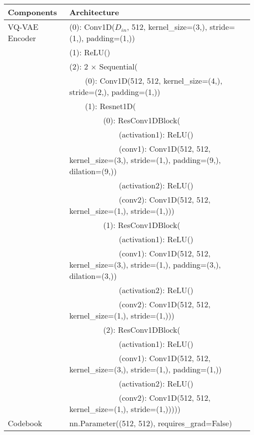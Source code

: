 \documentclass[10pt,twocolumn,letterpaper]{article}
\begin{document}
\begin{table*}[h]
    \centering\setlength{\tabcolsep}{12pt}
    \begin{tabular}{ll}
    \toprule
        Components & Architecture \\ \midrule
        VQ-VAE Encoder & (0): Conv1D($D_{in}$, 512, kernel\_size=(3,), stride=(1,), padding=(1,)) \\
        ~ & (1): ReLU() \\
        ~ & (2): 2 $\times$ Sequential( \\
        ~ &   ~~~~(0): Conv1D(512, 512, kernel\_size=(4,), stride=(2,), padding=(1,)) \\
        ~ &   ~~~~(1): Resnet1D( \\
        ~ &   ~~~~~~~~    (0): ResConv1DBlock( \\
        ~ &   ~~~~~~~~~~~~      (activation1): ReLU() \\
        ~ &   ~~~~~~~~~~~~      (conv1): Conv1D(512, 512, kernel\_size=(3,), stride=(1,), padding=(9,), dilation=(9,)) \\
        ~ &   ~~~~~~~~~~~~      (activation2): ReLU() \\
        ~ &   ~~~~~~~~~~~~      (conv2): Conv1D(512, 512, kernel\_size=(1,), stride=(1,))) \\
        ~ &   ~~~~~~~~    (1): ResConv1DBlock( \\
        ~ &   ~~~~~~~~~~~~      (activation1): ReLU() \\
        ~ &    ~~~~~~~~~~~~     (conv1): Conv1D(512, 512, kernel\_size=(3,), stride=(1,), padding=(3,), dilation=(3,)) \\
        ~ &   ~~~~~~~~~~~~      (activation2): ReLU() \\
        ~ &    ~~~~~~~~~~~~     (conv2): Conv1D(512, 512, kernel\_size=(1,), stride=(1,))) \\
        ~ &   ~~~~~~~~    (2): ResConv1DBlock( \\
        ~ &   ~~~~~~~~~~~~      (activation1): ReLU() \\
        ~ &   ~~~~~~~~~~~~      (conv1): Conv1D(512, 512, kernel\_size=(3,), stride=(1,), padding=(1,)) \\
        ~ &   ~~~~~~~~~~~~      (activation2): ReLU() \\
        ~ &   ~~~~~~~~~~~~      (conv2): Conv1D(512, 512, kernel\_size=(1,), stride=(1,))))) \\
        \midrule
        Codebook & nn.Parameter((512, 512), requires\_grad=False) \\

\end{tabular}
\end{table*}
\end{document}
